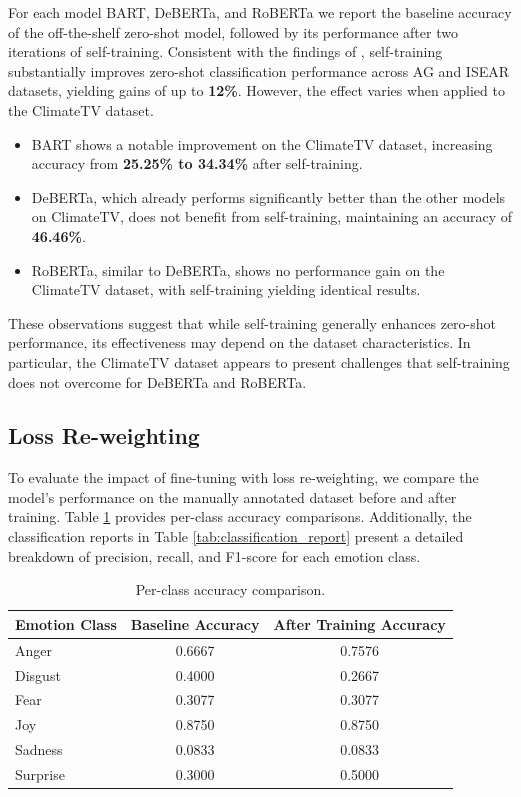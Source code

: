 For each model BART, DeBERTa, and RoBERTa we report the baseline accuracy of the off-the-shelf zero-shot model, followed by its performance after two iterations of self-training. Consistent with the findings of \citet{gera_zero-shot_2022}, self-training substantially improves zero-shot classification performance across AG and ISEAR datasets, yielding gains of up to \textbf{12\%}. However, the effect varies when applied to the ClimateTV dataset.

\begin{itemize}
    \item BART shows a notable improvement on the ClimateTV dataset, increasing accuracy from \textbf{25.25\% to 34.34\%} after self-training.
    \item DeBERTa, which already performs significantly better than the other models on ClimateTV, does not benefit from self-training, maintaining an accuracy of \textbf{46.46\%}.
    \item RoBERTa, similar to DeBERTa, shows no performance gain on the ClimateTV dataset, with self-training yielding identical results.
\end{itemize}

These observations suggest that while self-training generally enhances zero-shot performance, its effectiveness may depend on the dataset characteristics. In particular, the ClimateTV dataset appears to present challenges that self-training does not overcome for DeBERTa and RoBERTa.


\subsection{Loss Re-weighting}

To evaluate the impact of fine-tuning with loss re-weighting, we compare the model's performance on the manually annotated dataset before and after training. Table \ref{tab:per_class} provides per-class accuracy comparisons. Additionally, the classification reports in Table \ref{tab:classification_report} present a detailed breakdown of precision, recall, and F1-score for each emotion class.
\newline

\begin{table}[ht]
    \centering
    \begin{tabular}{lcc}
        \hline
        \textbf{Emotion Class} & \textbf{Baseline Accuracy} & \textbf{After Training Accuracy} \\
        \hline
        Anger & 0.6667 & 0.7576 \\
        Disgust & 0.4000 & 0.2667 \\
        Fear & 0.3077 & 0.3077 \\
        Joy & 0.8750 & 0.8750 \\
        Sadness & 0.0833 & 0.0833 \\
        Surprise & 0.3000 & 0.5000 \\
        \hline
    \end{tabular}
    \caption{Per-class accuracy comparison.}
    \label{tab:per_class}
\end{table}

